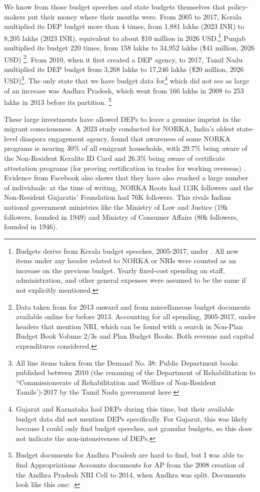 \documentclass[12pt]{article}
\begin{document}
   We know from those budget speeches and state budgets themselves that policy-makers put their money where their mouths were. From 2005 to 2017, Kerala multiplied its DEP budget more than 4 times, from 1,881 lakhs (2023 INR) to 8,205 lakhs (2023 INR), equivalent to about \$10 million in 2026 USD.\footnote{Budgets derive from Kerala budget speeches, 2005-2017, under \citet{noauthor_kerala_nodate}. All new items under any header related to NORKA or NRIs were counted as an increase on the previous budget. Yearly fixed-cost spending on staff, administration, and other general expenses were assumed to be the same if not explicitly mentioned.} Punjab multiplied its budget 220 times, from 158 lakhs to 34,952 lakhs (\$41 million, 2026 USD) \footnote{Data taken from \citet{noauthor_department_nodate} for 2013 onward and from miscellaneous budget documents available online for before 2013. Accounting for all spending, 2005-2017, under headers that mention NRI, which can be found with a search in Non-Plan Budget Book Volume 2/3s and Plan Budget Books. Both revenue and capital expenditures considered.}. From 2010, when it first created a DEP agency, to 2017, Tamil Nadu multiplied its DEP budget from 3,268 lakhs to 17,246 lakhs (\$20 million, 2026 USD)\footnote{All line items taken from the Demand No. 38: Public Department books published between 2010 (the renaming of the Department of Rehabilitation to ``Commissionerate of Rehabilitation and Welfare of Non-Resident Tamils')-2017 by the Tamil Nadu government here \citep{noauthor_budget_nodate}
   }. The only state that we have budget data for\footnote{Gujarat and Karnataka had DEPs during this time, but their available budget data did not mention DEPs specifically. For Gujarat, this was likely because I could only find budget speeches, not granular budgets, so this does not indicate the non-intensiveness of DEPs.} which did not see as large of an increase was Andhra Pradesh, which went from 166 lakhs in 2008 to 253 lakhs in 2013 before its partition. \footnote{Budget documents for Andhra Pradesh are hard to find, but I was able to find Appropriations Accounts documents for AP from the 2008 creation of the Andhra Pradesh NRI Cell to 2014, when Andhra was split. Documents look like this one: \citep{government_of_andhra_pradesh_government_2009}.}

   
   These large investments have allowed DEPs to leave a genuine imprint in the migrant consciousness. A 2023 study conducted for NORKA, India's oldest state-level diaspora engagement agency, found that awareness of some NORKA programs is nearing 30\% of all emigrant households, with 29.7\% being aware of the Non-Resident Keralite ID Card and 26.3\% being aware of certificate attestation programs (for proving certification in trades for working overseas) \citep{rajan_kerala_2023}. Evidence from Facebook also shows that they have also reached a large number of individuals: at the time of writing, NORKA Roots had 113K followers and the Non-Resident Gujaratis' Foundation had 76K followers. This rivals Indian national government ministries like the Ministry of Law and Justice (19k followers, founded in 1949) and Ministry of Consumer Affairs (80k followers, founded in 1946). 
   
\end{document}
